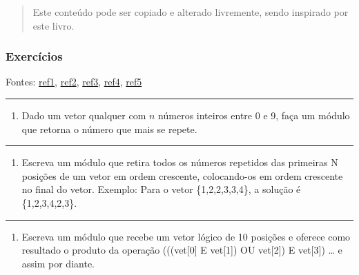\documentclass[12pt,a4paper]{article}
\renewcommand{\linethickness}{0.05em}
\providecommand{\tightlist}{%
      \setlength{\itemsep}{0pt}\setlength{\parskip}{0pt}}
\begin{document}
\begin{quote}
Este conteúdo pode ser copiado e alterado livremente, sendo inspirado
por este livro.
\end{quote}

    \hypertarget{exercuxedcios}{%
\subsubsection{Exercícios}\label{exercuxedcios}}

Fontes:
\href{http://www.deinf.ufma.br/~csalles/prog/prog_lista2.pdf}{ref1},
\href{http://www.sistemas24horas.com.br/aulas/files_dic1/lista-exercicios-vetores-1.pdf}{ref2},
\href{https://fit.faccat.br/~fpereira/apostilas/exerc_resp_alg_mar2007.pdf}{ref3},
\href{https://docplayer.com.br/54457072-Laboratorio-de-programacao-a-exercicios-sobre-vetores-e-matrizes.html}{ref4},
\href{https://docplayer.com.br/21195395-Exercicios-vetores-e-matrizes.html}{ref5}

    \begin{center}\rule{0.5\linewidth}{\linethickness}\end{center}

\begin{enumerate}
\def\labelenumi{\arabic{enumi}.}
\tightlist
\item
  Dado um vetor qualquer com \(n\) números inteiros entre 0 e 9, faça um
  módulo que retorna o número que mais se repete.
\end{enumerate}

    \begin{center}\rule{0.5\linewidth}{\linethickness}\end{center}

\begin{enumerate}
\def\labelenumi{\arabic{enumi}.}
\setcounter{enumi}{1}
\tightlist
\item
  Escreva um módulo que retira todos os números repetidos das primeiras
  N posições de um vetor em ordem crescente, colocando-os em ordem
  crescente no final do vetor. Exemplo: Para o vetor \{1,2,2,3,3,4\}, a
  solução é \{1,2,3,4,2,3\}.
\end{enumerate}

    \begin{center}\rule{0.5\linewidth}{\linethickness}\end{center}

\begin{enumerate}
\def\labelenumi{\arabic{enumi}.}
\setcounter{enumi}{2}
\tightlist
\item
  Escreva um módulo que recebe um vetor lógico de 10 posições e oferece
  como resultado o produto da operação (((vet{[}0{]} E vet{[}1{]}) OU
  vet{[}2{]}) E vet{[}3{]}) \ldots{} e assim por diante.
\end{enumerate}
\end{document}

